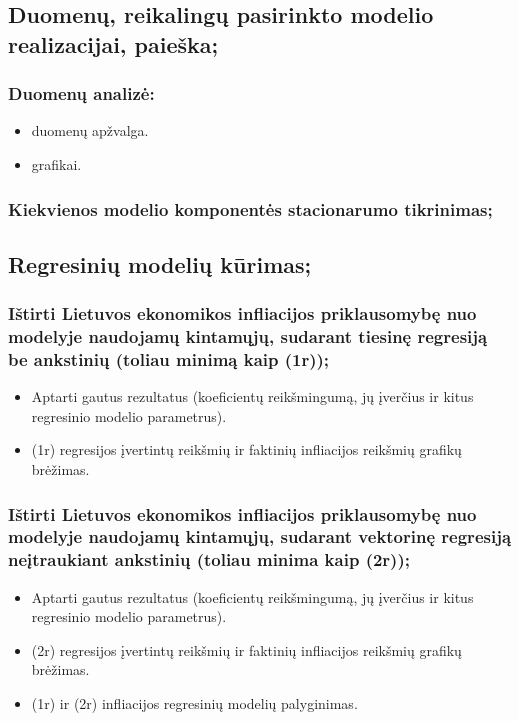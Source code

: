 \documentclass[a4paper]{article}
\begin{document}
\subsection{	Duomenų, reikalingų pasirinkto modelio realizacijai, paieška;}
\subsubsection{Duomenų analizė:}
\begin{itemize}
\item  duomenų apžvalga.
\item grafikai.
\end{itemize}
\subsubsection{Kiekvienos modelio komponentės stacionarumo tikrinimas;}
\subsection{Regresinių modelių kūrimas;}
\subsubsection{Ištirti Lietuvos ekonomikos infliacijos priklausomybę nuo modelyje naudojamų kintamųjų, sudarant tiesinę regresiją be ankstinių (toliau minimą kaip (1r));}
\begin{itemize}
\item Aptarti gautus rezultatus (koeficientų reikšmingumą, jų įverčius ir kitus regresinio modelio parametrus).
\item (1r) regresijos įvertintų reikšmių ir faktinių infliacijos reikšmių grafikų brėžimas.
\end{itemize}
\subsubsection{Ištirti Lietuvos ekonomikos infliacijos priklausomybę nuo modelyje naudojamų kintamųjų, sudarant vektorinę regresiją neįtraukiant ankstinių (toliau minima kaip (2r));}
\begin{itemize}
\item Aptarti gautus rezultatus (koeficientų reikšmingumą, jų įverčius ir kitus regresinio modelio parametrus).
\item (2r) regresijos įvertintų reikšmių ir faktinių infliacijos reikšmių grafikų brėžimas.
\item  (1r) ir (2r) infliacijos regresinių modelių palyginimas.
\end{itemize}
\end{document}

